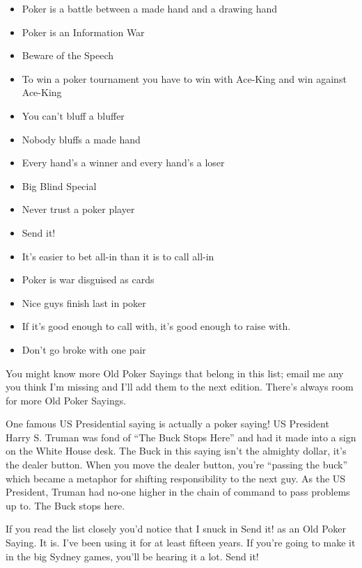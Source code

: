 \begin{itemize}
  \item Poker is a battle between a made hand and a drawing hand
  \item Poker is an Information War
  \item Beware of the Speech
  \item To win a poker tournament you have to win with Ace-King and win
    against Ace-King
  \item You can't bluff a bluffer
  \item Nobody bluffs a made hand
  \item Every hand's a winner and every hand's a loser
  \item Big Blind Special
  \item Never trust a poker player
  \item Send it!
  \item It's easier to bet all-in than it is to call all-in
  \item Poker is war disguised as cards
  \item Nice guys finish last in poker
  \item If it's good enough to call with, it's good enough to raise with.
  \item Don't go broke with one pair
\end{itemize}

You might know more Old Poker Sayings that belong in this list;
email me any you think I'm missing and I'll add them to the next
edition. There's always room for more Old Poker Sayings.

One famous US Presidential saying is actually a poker saying!
US President Harry S. Truman was fond of ``The Buck Stops Here'' and
had it made into a sign on the White House desk. The Buck in
this saying isn't the almighty dollar, it's the dealer button. When
you move the dealer button, you're ``passing the buck'' which became a
metaphor for shifting responsibility to the next guy. As the US
President, Truman had no-one higher in the chain of command to pass
problems up to. The Buck stops here.

If you read the list closely you'd notice that I snuck in
Send it! as an Old Poker Saying. It is. I've been using it for at
least fifteen years. If you're going to make it in the big Sydney
games, you'll be hearing it a lot. Send it!
